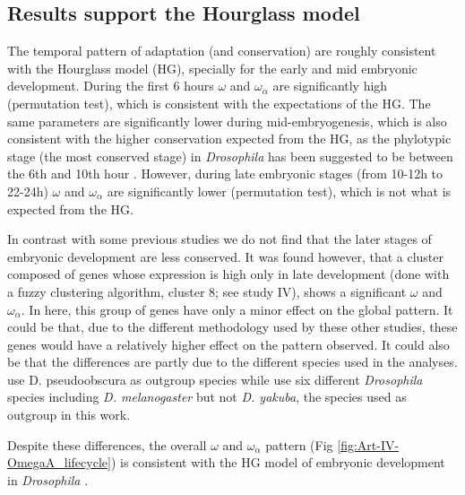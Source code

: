 \subsection{Results support the Hourglass model}

The temporal pattern of adaptation (and conservation) are roughly consistent with the Hourglass model (HG), specially for the early and mid embryonic development.
During the first 6 hours $\omega$ and $\omega_{\alpha}$ are significantly high (permutation test), which is consistent with the expectations of the HG.
The same parameters are significantly lower during mid-embryogenesis, which is also consistent with the higher conservation expected from the HG, as the phylotypic stage (the most conserved stage) in \textit{Drosophila} has been suggested to be between the 6th and 10th hour \citep{Drost2015}.
However, during late embryonic stages (from 10-12h to 22-24h) $\omega$ and $\omega_{\alpha}$ are significantly lower (permutation test), which is not what is expected from the HG.

In contrast with some previous studies \citep{Davis2005,Kalinka2010} we do not find that the later stages of embryonic development are less conserved. 
It was found however, that a cluster composed of genes whose expression is high only in late development (done with a fuzzy clustering algorithm, cluster 8; see study IV), shows a significant $\omega$ and $\omega_{\alpha}$. In here, this group of genes have only a minor effect on the global pattern.
It could be that, due to the different methodology used by these other studies, these genes would have a relatively higher effect on the pattern observed. It could also be that the differences are partly due to the different species used in the analyses.\citet{Davis2005} use D. pseudoobscura as outgroup species while \citet{Kalinka2010} use six different \textit{Drosophila} species including \textit{D. melanogaster} but not \textit{D. yakuba}, the species used as outgroup in this work.

Despite these differences, the overall $\omega$ and $\omega_{\alpha}$ pattern (Fig \ref{fig:Art-IV-OmegaA_lifecycle}) is consistent with the HG model of embryonic development in \textit{Drosophila} \citep{Kalinka2010}.


